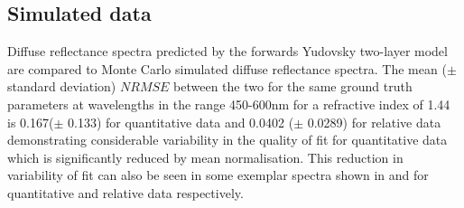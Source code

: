 \subsection{Simulated data}\label{sec:resultsMC2}
Diffuse reflectance spectra predicted by the forwards Yudovsky two-layer model are compared to Monte Carlo simulated diffuse reflectance spectra. The mean ($\pm$ standard deviation) $NRMSE$ between the two for the same ground truth parameters at wavelengths in the range 450-600nm for a refractive index of 1.44 is 0.167($\pm$ 0.133) for quantitative data and 0.0402 ($\pm$ 0.0289) for relative data demonstrating considerable variability in the quality of fit for quantitative data which is significantly reduced by mean normalisation. This reduction in variability of fit can also be seen in some exemplar spectra shown in  and  for quantitative and relative data respectively. 
